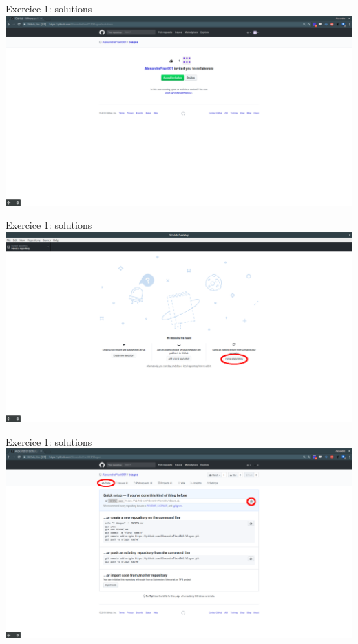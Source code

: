 \documentclass{beamer}
\begin{document}
\begin{frame}{Exercice 1: solutions}
    \centering
    \includegraphics[width=\textwidth]{img/image_exercices/accept_invitation.png}
\end{frame}

\begin{frame}{Exercice 1: solutions}
    \centering
    \includegraphics[width=\textwidth]{img/image_exercices/clonning_repo.png}
\end{frame}

\begin{frame}{Exercice 1: solutions}
    \centering
    \includegraphics[width=\textwidth]{img/image_exercices/getting_url.png}
\end{frame}
\end{document}
